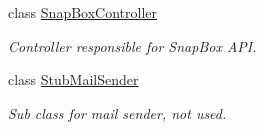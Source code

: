 \begin{DoxyCompactItemize}
\item 
class \mbox{\hyperlink{class_f_w_p_s_1_1_controllers_1_1_snap_box_controller}{Snap\+Box\+Controller}}
\begin{DoxyCompactList}\small\item\em Controller responsible for Snap\+Box A\+PI. \end{DoxyCompactList}\item 
class \mbox{\hyperlink{class_f_w_p_s_1_1_controllers_1_1_stub_mail_sender}{Stub\+Mail\+Sender}}
\begin{DoxyCompactList}\small\item\em Sub class for mail sender, not used. \end{DoxyCompactList}\end{DoxyCompactItemize}
